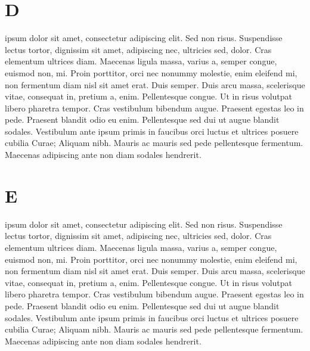 \documentclass{article}
\begin{document}
\pend


\section{D}



\pstart
{}       ipsum dolor sit amet, consectetur adipiscing elit. Sed non risus. Suspendisse lectus tortor, dignissim sit amet, adipiscing nec, ultricies sed, dolor. Cras elementum ultrices diam. Maecenas ligula massa, varius a, semper congue, euismod non, mi. Proin porttitor, orci nec nonummy molestie, enim  eleifend mi, non fermentum diam nisl sit amet erat. Duis semper. Duis arcu massa, scelerisque vitae, consequat in, pretium a, enim. Pellentesque congue. Ut in risus volutpat libero pharetra tempor. Cras vestibulum bibendum augue. Praesent egestas leo in pede. Praesent blandit odio eu enim. Pellentesque sed dui ut augue blandit sodales. Vestibulum ante ipsum primis in faucibus orci luctus et ultrices posuere cubilia Curae; Aliquam nibh. Mauris ac mauris sed pede pellentesque fermentum. Maecenas adipiscing ante non diam sodales hendrerit. 

\pend


\section{E}



\pstart
{}       ipsum dolor sit amet, consectetur adipiscing elit. Sed non risus. Suspendisse lectus tortor, dignissim sit amet, adipiscing nec, ultricies sed, dolor. Cras elementum ultrices diam. Maecenas ligula massa, varius a, semper congue, euismod non, mi. Proin porttitor, orci nec nonummy molestie, enim  eleifend mi, non fermentum diam nisl sit amet erat. Duis semper. Duis arcu massa, scelerisque vitae, consequat in, pretium a, enim. Pellentesque congue. Ut in risus volutpat libero pharetra tempor. Cras vestibulum bibendum augue. Praesent egestas leo in pede. Praesent blandit odio eu enim. Pellentesque sed dui ut augue blandit sodales. Vestibulum ante ipsum primis in faucibus orci luctus et ultrices posuere cubilia Curae; Aliquam nibh. Mauris ac mauris sed pede pellentesque fermentum. Maecenas adipiscing ante non diam sodales hendrerit. 
\end{document}
